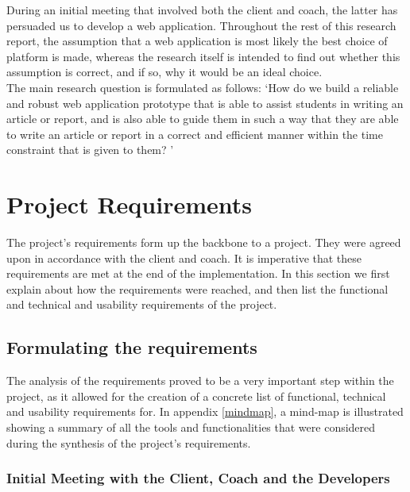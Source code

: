 During an initial meeting that involved both the client and coach, the latter has persuaded us to develop a web application. Throughout the rest of this research report, the assumption that a web application is most likely the best choice of platform is made, whereas the research itself is intended to find out whether this assumption is correct, and if so, why it would be an ideal choice. \\

The main research question is formulated as follows: `How do we build a reliable and robust web application prototype that is able to assist students in writing an article or report, and is also able to guide them in such a way that they are able to write an article or report in a correct and efficient manner within the time constraint that is given to them? '

\section{Project Requirements}
\label{req}

The project's requirements form up the backbone to a project. They were agreed upon in accordance with the client and coach. It is imperative that these requirements are met at the end of the implementation. In this section we first explain about how the requirements were reached, and then list the functional and technical and usability requirements of the project.

\subsection{Formulating the requirements} %
\label{sub:subsection_name}
The analysis of the requirements proved to be a very important step within the project, as it allowed for the creation of a concrete list of functional, technical and usability requirements for. In appendix \ref{mindmap}, a mind-map is illustrated showing a summary of all the tools and functionalities that were considered during the synthesis of the project's requirements.


\subsubsection{Initial Meeting with the Client, Coach and the Developers} %
\label{sub:meeting_client_coach_developer_team_meeting_}


